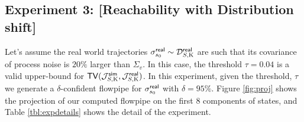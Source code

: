 \subsection{Experiment 3: [Reachability with Distribution shift]} Let's assume the real world trajectories $\sigma^{\mathsf{real}}_{s_0} \sim \mathcal{D}_{S,\mathrm{K}}^{\mathsf{real}}$ are such that its covariance of process noise is $20\%$ larger than $\Sigma_v$. In this case, the threshold $\tau = 0.04$ is a valid upper-bound for $\mathsf{TV}(\mathcal{J}_{S,\mathrm{K}}^{\mathsf{sim}}, \mathcal{J}_{S,\mathrm{K}}^{\mathsf{real}})$. In this experiment, given the threshold, $\tau$ we generate a $\delta$-confident flowpipe for $\sigma^{\mathsf{real}}_{s_0}$ with $\delta = 95\%$. Figure \ref{fig:proj} shows the projection of our computed flowpipe on the first $8$ components of states, and Table \ref{tbl:expdetails} shows the detail of the experiment.